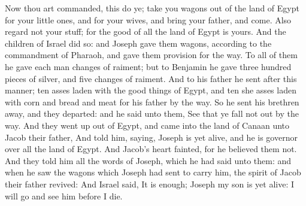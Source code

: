 \begin{biblechapter}
\verse Now thou art commanded, this do ye; take you wagons out of the land of Egypt for your little ones, and for your wives, and bring your father, and come.
\verse Also regard not your stuff; for the good of all the land of Egypt is yours.
\verse And the children of Israel did so: and Joseph gave them wagons, according to the commandment of Pharaoh, and gave them provision for the way.
\verse To all of them he gave each man changes of raiment; but to Benjamin he gave three hundred pieces of silver, and five changes of raiment.
\verse And to his father he sent after this manner; ten asses laden with the good things of Egypt, and ten she asses laden with corn and bread and meat for his father by the way.
\verse So he sent his brethren away, and they departed: and he said unto them, See that ye fall not out by the way.
\verse And they went up out of Egypt, and came into the land of Canaan unto Jacob their father,
\verse And told him, saying, Joseph is yet alive, and he is governor over all the land of Egypt. And Jacob's heart fainted, for he believed them not.
\verse And they told him all the words of Joseph, which he had said unto them: and when he saw the wagons which Joseph had sent to carry him, the spirit of Jacob their father revived:
\verse And Israel said, It is enough; Joseph my son is yet alive: I will go and see him before I die.
\end{biblechapter}

